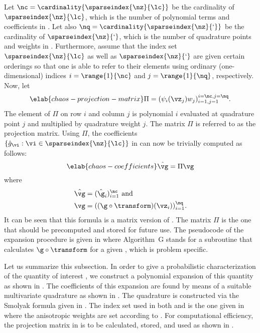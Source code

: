 Let $\nc = \cardinality{\sparseindex{\nz}{\lc}}$ be the cardinality of
$\sparseindex{\nz}{\lc}$, which is the number of polynomial terms and
coefficients in . Let also $\nq =
\cardinality{\sparseindex{\nz}{\lq}}$ be the cardinality of
$\sparseindex{\nz}{\lq}$, which is the number of quadrature points and weights
in . Furthermore, assume that the index set
$\sparseindex{\nz}{\lc}$ as well as $\sparseindex{\nz}{\lq}$ are given certain
orderings so that one is able to refer to their elements using ordinary
(one-dimensional) indices $i = \range{1}{\nc}$ and $j = \range{1}{\nq}$,
respectively. Now, let
\begin{equation} \elab{chaos-projection-matrix}
  \Pi = (\psi_i(\vz_j) w_j)_{i = 1, j = 1}^{i = \nc, j = \nq}.
\end{equation}
The element of $\Pi$ on row $i$ and column $j$ is polynomial $i$ evaluated at
quadrature point $j$ and multiplied by quadrature weight $j$. The matrix $\Pi$
is referred to as the projection matrix. Using $\Pi$, the coefficients $\{
\hat{g}_{\vi}: \vi \in \sparseindex{\nz}{\lc} \}$ in  can
now be trivially computed as follows:
\begin{equation} \elab{chaos-coefficients}
  \hat{\vg} = \Pi \vg
\end{equation}
where
\begin{align*}
  & \hat{\vg} = (\hat{\g}_i)_{i = 1}^\nc \text{ and} \\
  & \vg = ((\g \circ \transform)(\vz_i))_{i = 1}^\nq.
\end{align*}
It can be seen that this formula is a matrix version of
. The matrix $\Pi$ is the one that should be precomputed
and stored for future use. The pseudocode of the expansion procedure is given in
 where Algorithm~G stands for a subroutine that
calculates $\g \circ \transform$ for a given \vz, which is problem specific.

Let us summarize this subsection. In order to give a probabilistic
characterization of the quantity of interest \g, we construct a polynomial
expansion of this quantity as shown in . The coefficients
of this expansion are found by means of a suitable multivariate quadrature as
shown in . The quadrature is constructed via the Smolyak
formula given in . The index set used in both
 and  is the one given in
 where the anisotropic weights are set
according to . For computational efficiency, the
projection matrix in  is to be calculated, stored,
and used as shown in .

